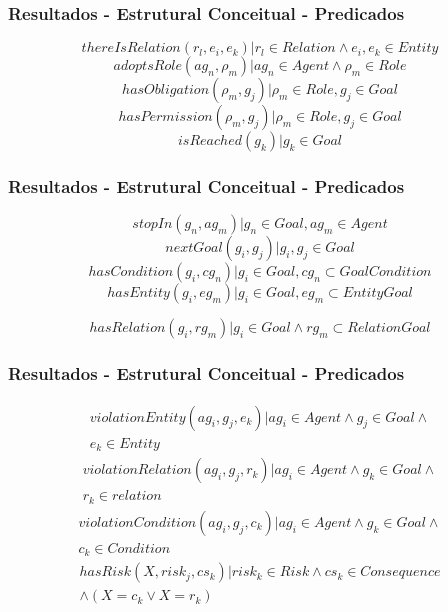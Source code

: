 \documentclass{beamer}
\begin{document}
\begin{frame}
	\frametitle{Resultados - Estrutural Conceitual - Predicados}
	\begin{equation}
		thereIsRelation(r_l,e_i,e_k) | r_l \in Relation \wedge  e_i, e_k \in Entity
	\end{equation}
	\begin{equation}	
		adoptsRole(ag_n,\rho_m) | ag_n \in Agent \wedge \rho_m \in Role 	
	\end{equation}
	\begin{equation}	
		hasObligation(\rho_m,g_j) | \rho_m \in Role, g_j \in Goal 
	\end{equation}		
	\begin{equation}	
		hasPermission(\rho_m, g_j) | \rho_m \in Role, g_j \in Goal
	\end{equation}
	\begin{equation}		
		isReached(g_k) | g_k \in Goal 
	\end{equation}
\end{frame}
\begin{frame}
	\frametitle{Resultados - Estrutural Conceitual - Predicados}
	\begin{equation}			
		stopIn(g_n, ag_m) | g_n \in Goal, ag_m \in Agent
	\end{equation}
	\begin{equation}			
		nextGoal(g_i,g_j) |g_i, g_j \in Goal
	\end{equation}
	\begin{equation}				
		hasCondition(g_i,cg_n) | g_i \in Goal, cg_n \subset GoalCondition
	\end{equation}
	\begin{equation}				
		hasEntity(g_i,eg_m) | g_i \in Goal, eg_m \subset EntityGoal 
	\end{equation}
	
	\begin{equation}				
		hasRelation(g_i,rg_m) | g_i \in Goal \wedge rg_m \subset RelationGoal 
	\end{equation}
\end{frame}
\begin{frame}
	\frametitle{Resultados - Estrutural Conceitual - Predicados}
	\begin{eqnarray}
	    violationEntity(ag_i,g_j,e_k) |   ag_i \in Agent \wedge g_j \in Goal \wedge \\ \nonumber 
		e_k \in Entity  
	\end{eqnarray}
	\begin{eqnarray}
	    violationRelation(ag_i,g_j,r_k) | ag_i \in Agent \wedge g_k \in Goal \wedge \\ \nonumber 
		r_k \in relation 
	\end{eqnarray}
	\begin{eqnarray}
	    violationCondition(ag_i,g_j,c_k) | ag_i \in Agent \wedge g_k \in Goal \wedge \\ \nonumber 
		c_k \in Condition 
	\end{eqnarray}
	\begin{eqnarray}
	    hasRisk(X, risk_j, cs_k) | risk_k \in Risk \wedge cs_k \in Consequence  \\ \nonumber 
	 	\wedge (X = c_k \vee X = r_k)
	\end{eqnarray}
\end{frame}
\end{document}
